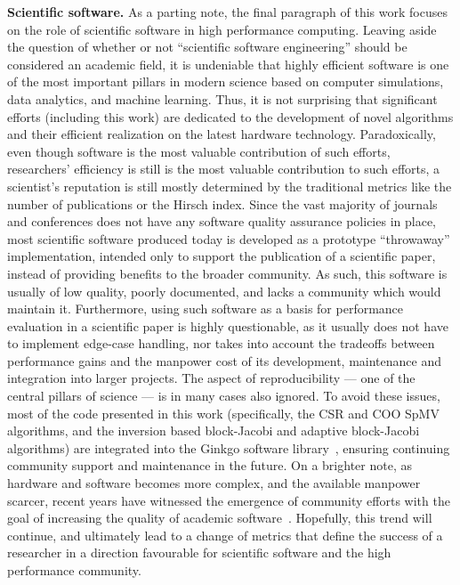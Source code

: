 \noindent\textbf{Scientific software.}
As a parting note, the final paragraph of this work focuses on the role of
scientific software in high performance computing. Leaving aside the question of
whether or not ``scientific software engineering'' should be considered an
academic field, it is undeniable that highly efficient software is one of the
most important pillars in modern science based on computer simulations, data
analytics, and machine learning.  Thus, it is not surprising that significant
efforts (including this work) are dedicated to the development of novel
algorithms and their efficient realization on the latest hardware technology.
Paradoxically, even though software is the
most valuable contribution of such efforts, researchers' efficiency is still
is the most valuable contribution to such efforts, a scientist's reputation is
still mostly determined by the traditional metrics like the number of
publications or the Hirsch index. Since the vast majority of journals and
conferences does not have any software quality assurance policies in place, most
scientific software produced today is developed as a prototype ``throwaway''
implementation, intended only to support the publication of a scientific paper,
instead of providing benefits to the broader community. As such, this software
is usually of low quality, poorly documented, and lacks a community which would
maintain it. Furthermore, using such software as a basis for performance
evaluation in a scientific paper is highly questionable, as it usually does not
have to implement edge-case handling, nor takes into account the tradeoffs
between performance gains and the manpower cost of its development, maintenance
and integration into larger projects. The aspect of reproducibility --- one of
the central pillars of science --- is in many cases also ignored. To avoid these
issues, most of the code presented in this work (specifically, the CSR and COO
SpMV algorithms, and the inversion based block-Jacobi and adaptive block-Jacobi
algorithms) are integrated into the Ginkgo software library~\cite{ginkgo},
ensuring continuing community support and maintenance in the future. On
a brighter note, as hardware and software becomes more complex, and the
available manpower scarcer, recent years have witnessed the emergence of
community efforts with the goal of increasing the quality of academic
software~\cite{toms,xsdk,bssw,patch-contrib}.  Hopefully, this trend will
continue, and ultimately lead to a change of metrics that define the success of
a researcher in a direction favourable for scientific software and the high
performance community.
